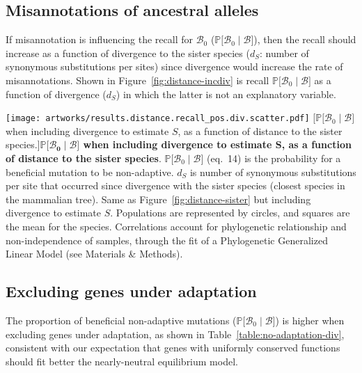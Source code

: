 \documentclass{article}
\newcommand{\proba}{\mathbb{P}}
\newcommand{\ds}{d_S}
\newcommand{\SphyBen}{\mathcal{B}_0}
\newcommand{\given}{\mid}
\newcommand{\Spop}{S}
\newcommand{\SpopBen}{\mathcal{B}}
\begin{document}
    \newpage

    \subsection{Misannotations of ancestral alleles}

    If misannotation is influencing the recall for $\SphyBen$ ($\proba{[}\SphyBen\given \SpopBen {]}$), then the recall should increase as a function of  divergence to the sister species ($\ds$: number of synonymous substitutions per sites) since divergence would increase the rate of misannotations.
    Shown in Figure~\ref{fig:distance-incdiv} is recall $\proba{[}\SphyBen\given \SpopBen {]}$ as a function of divergence ($\ds$) in which the latter is not an explanatory variable.

    \begin{center}
        \texttt{[image: artworks/results.distance.recall\_pos.div.scatter.pdf]}
        [$\proba{[}\SphyBen\given \SpopBen {]}$ when including divergence to estimate $\Spop$, as a function of distance to the sister species.]{\textbf{$\bm{\proba{[}\SphyBen\given \SpopBen {]}}$ when including divergence to estimate $\bm{\Spop}$, as a function of distance to the sister species}. $\proba{[} \SphyBen \given \SpopBen{]}$ (eq.~14) is the probability for a beneficial mutation to be non-adaptive. $\ds$ is number of synonymous substitutions per site that occurred since divergence with the sister species (closest species in the mammalian tree). Same as Figure~\ref{fig:distance-sister} but including divergence to estimate $\Spop$. Populations are represented by circles, and squares are the mean for the species. Correlations account for phylogenetic relationship and non-independence of samples, through the fit of a Phylogenetic Generalized Linear Model (see Materials \& Methods).\label{fig:distance-incdiv}}
    \end{center}

    \newpage

    \subsection{Excluding genes under adaptation}
    The proportion of beneficial non-adaptive mutations ($\proba{[}\SphyBen\given \SpopBen {]}$) is higher when excluding genes under adaptation, as shown in Table~\ref{table:no-adaptation-div}, consistent with our expectation that genes with uniformly conserved functions should fit better the nearly-neutral equilibrium model.
\end{document}
